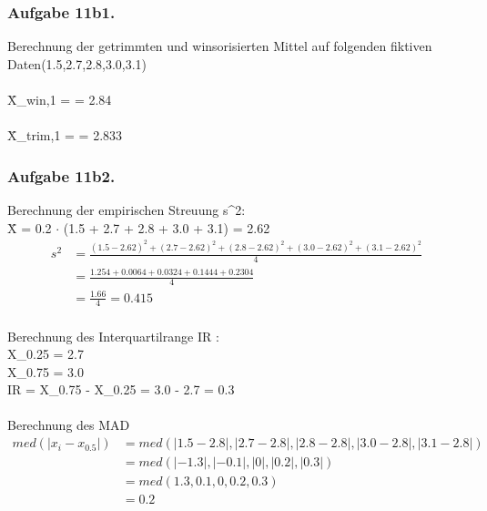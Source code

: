 \documentclass[a4paper,12pt]{article}
\newcommand{\ex}[1]{\newpage\subsubsection*{Aufgabe #1.}}
\begin{document}
	\ex{11b1}

	Berechnung der getrimmten und winsorisierten Mittel auf folgenden fiktiven Daten(1.5,2.7,2.8,3.0,3.1)\\\\
	
	
	
	
	\={X}_{win,1} =  = 2.84 \\\\
	
	\={X}_{trim,1} =  = 2.833
	
	
	

    
    
    
    \ex{11b2}
    
    Berechnung der empirischen Streuung s^2:\\
    
    \={X} = 0.2 $\cdot$ (1.5 + 2.7 + 2.8 + 3.0 + 3.1)   = 2.62 \\
    
    \begin{align*}
    s^2  
    &=\frac{(1.5-2.62)^2 + (2.7-2.62)^2 + (2.8-2.62)^2 + (3.0-2.62)^2 + (3.1-2.62)^2}{4}\\
    &= \frac{1.254 + 0.0064 + 0.0324 + 0.1444 + 0.2304}{4}\\
    &= \frac{1.66}{4} = 0.415\\
    \end{align*}
    
    Berechnung des Interquartilrange IR :\\
    
    X_{0.25} = 2.7\\
    X_{0.75} = 3.0\\
    IR = X_{0.75} - X_{0.25} = 3.0 - 2.7 = 0.3\\\\
    
    Berechnung des MAD\\
    \begin{align*}
    med(|x_{i}-x_{0.5}|)
    &= med(|1.5-2.8|,|2.7-2.8|,|2.8-2.8|,|3.0-2.8|,|3.1-2.8|)\\
    &= med(|-1.3|,|-0.1|,|0|,|0.2|,|0.3|)\\
    &= med(1.3,0.1,0,0.2,0.3)\\
    &= 0.2\\
    \end{align*}
   
\end{document}
